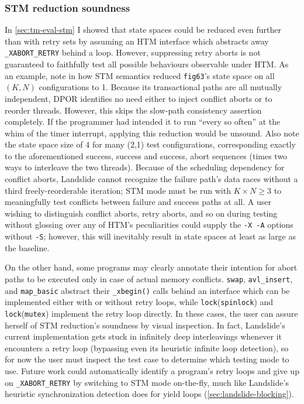 \subsubsection{STM reduction soundness}

In \cref{sec:tm-eval-stm} I showed that state spaces could be reduced even further than with retry sets
by assuming an HTM interface which abstracts away {\tt \_XABORT\_RETRY} behind a loop.
However, suppressing retry aborts is not guaranteed to faithfully test all possible behaviours
observable under HTM.
As an example, note in 
how STM semantics reduced %
{\tt fig63}'s state space on all $(K,N)$ configurations to 1.
Because its transactional paths are all mutually independent,
DPOR identifies no need either to inject conflict aborts or to reorder threads.
However, this skips the slow-path consistency assertion completely.
If the programmer had intended it to run ``every so often'' at the whim of the timer interrupt,
applying this reduction would be unsound.
Also note the state space size of 4 for many (2,1) test configurations,
corresponding exactly to the aforementioned success, success and success, abort sequences
(times two ways to interleave the two threads).
Because of the scheduling dependency for conflict aborts,
Landslide cannot recognize the failure path's data races
without a third freely-reorderable iteration;
STM mode must be run with $K \times N \ge 3$ to meaningfully test conflicts between failure and success paths at all.
A user wishing to distinguish conflict aborts, retry aborts, and so on during testing
without glossing over any of HTM's peculiarities
could supply the {\tt -X -A} options without {\tt -S};
however, this will inevitably result in state spaces at least as large as the baseline.

On the other hand, some programs may clearly annotate their intention
for abort paths to be executed only in case of actual memory conflicts.
{\tt swap}, {\tt avl\_insert}, and {\tt map\_basic} abstract their {\tt \_xbegin()} calls
behind an interface which can be implemented either with or without retry loops,
while {\tt lock}({\tt spinlock}) and {\tt lock}({\tt mutex}) implement the retry loop directly.
In these cases, the user can assure herself of STM reduction's soundness by visual inspection.
In fact, Landslide's current implementation gets stuck in infinitely deep interleavings
whenever it encounters a retry loop
(bypassing even its heuristic infinite loop detection),
so for now the user must inspect the test case to determine which testing mode to use.
Future work could automatically identify a program's retry loops
and give up on {\tt \_XABORT\_RETRY} by switching to STM mode on-the-fly,
much like Landslide's heuristic synchronization detection does for yield loops (\cref{sec:landslide-blocking}).

